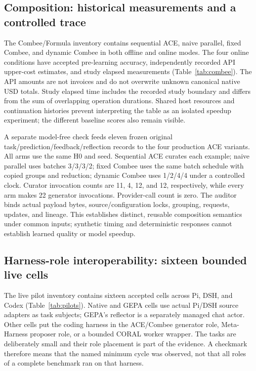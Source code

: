 \subsection{Composition: historical measurements and a controlled trace}
\label{sec:mechanism}
The Combee/Formula inventory contains sequential ACE, naive parallel, fixed Combee, and dynamic Combee in both offline and online modes. The four online conditions have accepted pre-learning accuracy, independently recorded API upper-cost estimates, and study elapsed measurements (Table~\ref{tab:combee}). The API amounts are not invoices and do not overwrite unknown canonical native USD totals. Study elapsed time includes the recorded study boundary and differs from the sum of overlapping operation durations. Shared host resources and continuation histories prevent interpreting the table as an isolated speedup experiment; the different baseline scores also remain visible.



A separate model-free check feeds eleven frozen original task/prediction/feedback/reflection records to the four production ACE variants. All arms use the same H0 and seed. Sequential ACE curates each example; naive parallel uses batches 3/3/3/2; fixed Combee uses the same batch schedule with copied groups and reduction; dynamic Combee uses 1/2/4/4 under a controlled clock. Curator invocation counts are 11, 4, 12, and 12, respectively, while every arm makes 22 generator invocations. Provider-call count is zero. The auditor binds actual payload bytes, source/configuration locks, grouping, requests, updates, and lineage. This establishes distinct, reusable composition semantics under common inputs; synthetic timing and deterministic responses cannot establish learned quality or model speedup.

\subsection{Harness-role interoperability: sixteen bounded live cells}
\label{sec:pilots}
The live pilot inventory contains sixteen accepted cells across Pi, DSH, and Codex (Table~\ref{tab:pilots}). Native and GEPA cells use actual Pi/DSH source adapters as task subjects; GEPA's reflector is a separately managed chat actor. Other cells put the coding harness in the ACE/Combee generator role, Meta-Harness proposer role, or a bounded CORAL worker wrapper. The tasks are deliberately small and their role placement is part of the evidence. A checkmark therefore means that the named minimum cycle was observed, not that all roles of a complete benchmark ran on that harness.


